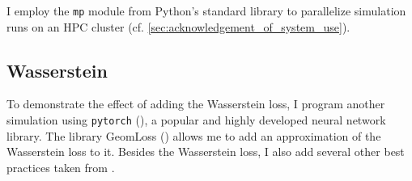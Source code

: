 I employ the \texttt{mp} module from Python's standard library to parallelize simulation runs on an HPC cluster (cf. \ref{sec:acknowledgement_of_system_use}).

\subsection{Wasserstein}

To demonstrate the effect of adding the Wasserstein loss, I program another simulation using \texttt{pytorch} (\textcite{Ansel_PyTorch_2_Faster_2024}), a popular and highly developed neural network library.
The library GeomLoss (\textcite{feydy2019interpolating}) allows me to add an approximation of the Wasserstein loss to it.
Besides the Wasserstein loss, I also add several other best practices taken from \cite{athey2021using}.
